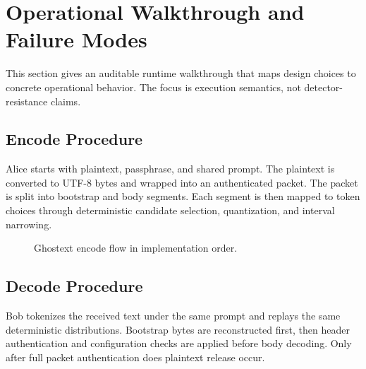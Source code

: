 \section{Operational Walkthrough and Failure Modes}

This section gives an auditable runtime walkthrough that maps design choices to concrete operational behavior. The focus is execution semantics, not detector-resistance claims.

\subsection{Encode Procedure}

Alice starts with plaintext, passphrase, and shared prompt. The plaintext is converted to UTF-8 bytes and wrapped into an authenticated packet. The packet is split into bootstrap and body segments. Each segment is then mapped to token choices through deterministic candidate selection, quantization, and interval narrowing.

\begin{figure}[t]
\small
{}
\caption{Ghostext encode flow in implementation order.}
\label{fig:encode-walkthrough}
\end{figure}

\subsection{Decode Procedure}

Bob tokenizes the received text under the same prompt and replays the same deterministic distributions. Bootstrap bytes are reconstructed first, then header authentication and configuration checks are applied before body decoding. Only after full packet authentication does plaintext release occur.

